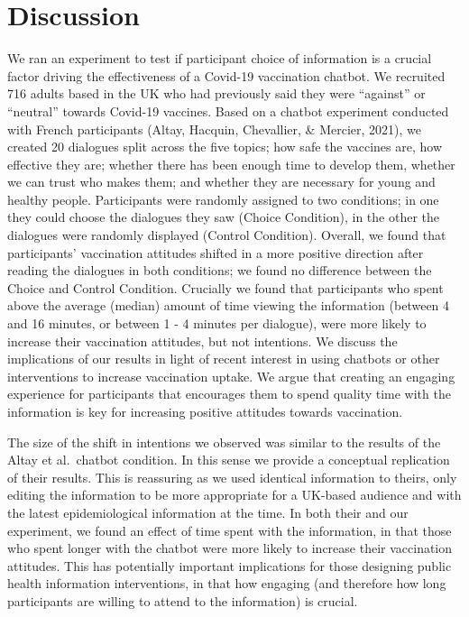 \documentclass[
  english,
  ,jou,floatsintext]{apa6}
\begin{document}
\hypertarget{discussion}{%
\section{Discussion}\label{discussion}}

We ran an experiment to test if participant choice of information is a crucial factor driving the effectiveness of a Covid-19 vaccination chatbot. We recruited 716 adults based in the UK who had previously said they were ``against'' or ``neutral'' towards Covid-19 vaccines. Based on a chatbot experiment conducted with French participants (Altay, Hacquin, Chevallier, \& Mercier, 2021), we created 20 dialogues split across the five topics; how safe the vaccines are, how effective they are; whether there has been enough time to develop them, whether we can trust who makes them; and whether they are necessary for young and healthy people. Participants were randomly assigned to two conditions; in one they could choose the dialogues they saw (Choice Condition), in the other the dialogues were randomly displayed (Control Condition). Overall, we found that participants' vaccination attitudes shifted in a more positive direction after reading the dialogues in both conditions; we found no difference between the Choice and Control Condition. Crucially we found that participants who spent above the average (median) amount of time viewing the information (between 4 and 16 minutes, or between 1 - 4 minutes per dialogue), were more likely to increase their vaccination attitudes, but not intentions. We discuss the implications of our results in light of recent interest in using chatbots or other interventions to increase vaccination uptake. We argue that creating an engaging experience for participants that encourages them to spend quality time with the information is key for increasing positive attitudes towards vaccination.

The size of the shift in intentions we observed was similar to the results of the Altay et al.~chatbot condition. In this sense we provide a conceptual replication of their results. This is reassuring as we used identical information to theirs, only editing the information to be more appropriate for a UK-based audience and with the latest epidemiological information at the time. In both their and our experiment, we found an effect of time spent with the information, in that those who spent longer with the chatbot were more likely to increase their vaccination attitudes. This has potentially important implications for those designing public health information interventions, in that how engaging (and therefore how long participants are willing to attend to the information) is crucial.
\end{document}
